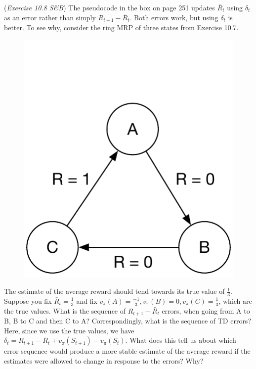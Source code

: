 (\textit{Exercise 10.8 S\&B})
The pseudocode in the box on page 251 updates $\bar R_{t}$ using $\delta_{t}$ as an error rather than simply $R_{t+1} -  \bar R_t$.
Both errors work, but using $\delta_{t}$ is better.
To see why, consider the ring MRP of three states from Exercise 10.7.
\begin{figure}
  \center
  \includegraphics[width=0.2\linewidth]{figures/10dot8.pdf}
\end{figure}
The estimate of the average reward should tend towards its true value of $\frac{1}{3}$.
Suppose you fix $\bar R_{t} = \frac{1}{3}$ and fix $v_{\pi}(A) = \frac{-1}{3}, v_{\pi}(B) = 0, v_{\pi}(C) = \frac{1}{3}$, which are the true values.
What is the sequence of $R_{t+1} - \bar R_{t}$ errors, when going from A to B, B to C and then C to A?
Correspondingly, what is the sequence of TD errors? Here, since we use the true values, we have
$\delta_{t} = R_{t+1} - \bar R_{t} + v_{\pi} (S_{t+1}) - v_\pi (S_{t})$. 
What does this tell us about which error sequence would produce a more stable estimate of the average reward if the estimates were allowed to change in response to the errors? Why?
